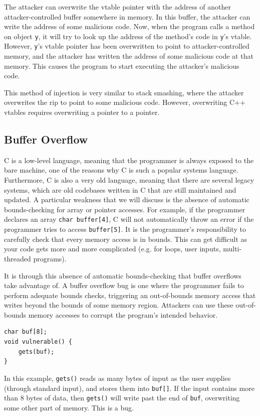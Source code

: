 \documentclass[a4paper]{exam}
\theoremstyle{definition}
\begin{document}
The attacker can overwrite the vtable pointer with the address of
another attacker-controlled buffer somewhere in memory. In this buffer,
the attacker can write the address of some malicious code. Now, when the
program calls a method on object \texttt{y}, it will try to look up the
address of the method's code in \texttt{y}'s vtable. However,
\texttt{y}'s vtable pointer has been overwritten to point to
attacker-controlled memory, and the attacker has written the address of
some malicious code at that memory. This causes the program to start
executing the attacker's malicious code.

This method of injection is very similar to stack smashing, where the
attacker overwrites the rip to point to some malicious code. However,
overwriting C++ vtables requires overwriting a pointer to a pointer.

\subsection{Buffer Overflow}
C is a low-level language, meaning that the programmer is always exposed to the bare machine, one of the reasons why C is such a popular systems language. Furthermore, C is also a very old language, meaning that there are several legacy systems, which are old codebases written in C that are still maintained and updated. A particular weakness that we will discuss is the absence of automatic bounds-checking for array or pointer accesses. For example, if the programmer declares an array \texttt{char buffer[4]}, C will not automatically throw an error if the programmer tries to access \texttt{buffer[5]}. It is the programmer’s responsibility to carefully check that every memory access is in bounds. This can get difficult as your code gets more and more complicated (e.g. for loops, user inputs, multi-threaded programs).


It is through this absence of automatic bounds-checking that buffer
overflows take advantage of. A buffer overflow bug is one where the
programmer fails to perform adequate bounds checks, triggering an
out-of-bounds memory access that writes beyond the bounds of some memory
region. Attackers can use these out-of-bounds memory accesses to corrupt
the program's intended behavior.

\begin{verbatim}
char buf[8];
void vulnerable() {
    gets(buf);
}
\end{verbatim}


In this example, \texttt{gets()} reads as many bytes of input as the
user supplies (through standard input), and stores them into
\texttt{buf{[}{]}}. If the input contains more than 8 bytes of data,
then \texttt{gets()} will write past the end of \texttt{buf},
overwriting some other part of memory. This is a bug.
\end{document}
